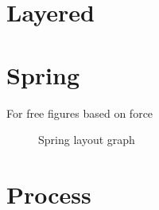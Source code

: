 \documentclass{book}
\begin{document}
\section{Layered}

    
    

        
\section{Spring}
    For free figures based on force
    \begin{figure}[H]
        \raggedright
        
        \caption{Spring layout graph}
        \label{fig:spring-graph}
    \end{figure}
    
\section{Process}
\end{document}
